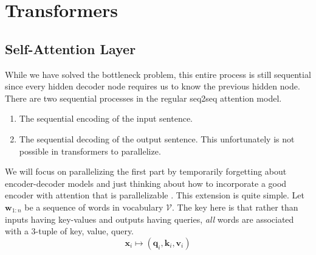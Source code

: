 \section{Transformers} 

\subsection{Self-Attention Layer}

    While we have solved the bottleneck problem, this entire process is still sequential since every hidden decoder node requires us to know the previous hidden node. There are two sequential processes in the regular seq2seq attention model. 
    \begin{enumerate}
      \item The sequential encoding of the input sentence. 
      \item The sequential decoding of the output sentence. This unfortunately is not possible in transformers to parallelize. 
    \end{enumerate}

    We will focus on parallelizing the first part by temporarily forgetting about encoder-decoder models and just thinking about how to incorporate a good encoder with attention that is parallelizable \cite{vaswani2017attention}. This extension is quite simple. Let $\mathbf{w}_{1:n}$ be a sequence of words in vocabulary $\mathcal{V}$. The key here is that rather than inputs having key-values and outputs having queries, \textit{all} words are associated with a 3-tuple of key, value, query. 
    \begin{equation}
      \mathbf{x}_i \mapsto (\mathbf{q}_i, \mathbf{k}_i, \mathbf{v}_i)
    \end{equation}

